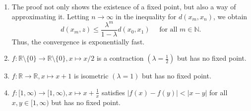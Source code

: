 \documentclass[a4paper,11pt]{article}
\begin{document}
\begin{remark}
\begin{enumerate}
    \item The proof not only shows the existence of a fixed point, but also a way of approximating it. Letting $n \rightarrow \infty$ in the inequality for $d\left(x_m, x_n\right)$, we obtain
    \[
    d\left(x_m, z\right) \leqslant \frac{\lambda^m}{1-\lambda} d\left(x_0, x_1\right) \quad \text { for all } m \in \mathbb{N}.
    \]
    Thus, the convergence is exponentially fast.
    \item $f: \mathbb{R} \setminus\{0\} \rightarrow \mathbb{R} \setminus\{0\}, x \mapsto x / 2$ is a contraction $\left(\lambda=\frac{1}{2}\right)$ but has no fixed point.
    \item $f: \mathbb{R} \rightarrow \mathbb{R}, x \mapsto x+1$ is isometric $(\lambda=1)$ but has no fixed point.
    \item $f:[1, \infty) \rightarrow[1, \infty), x \mapsto x+\frac{1}{x}$ satisfies $|f(x)-f(y)|<|x-y|$ for all $x, y \in[1, \infty)$ but has no fixed point.
\end{enumerate}
\end{remark}
\end{document}
